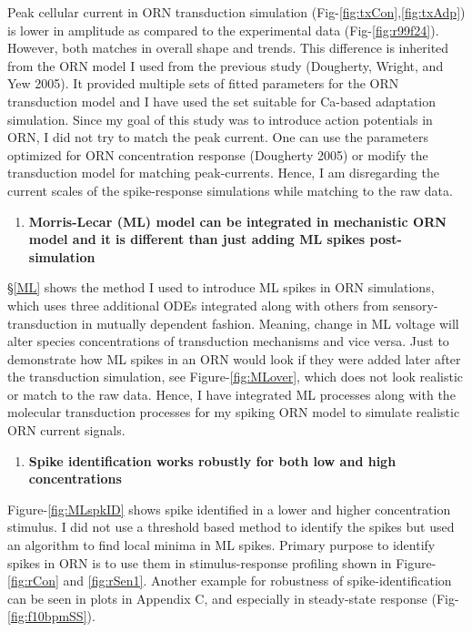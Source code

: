 \documentclass[
]{article}
\providecommand{\tightlist}{%
  \setlength{\itemsep}{0pt}\setlength{\parskip}{0pt}}
\begin{document}
Peak cellular current in ORN transduction simulation (Fig-\ref{fig:txCon},\ref{fig:txAdp}) is lower in amplitude as compared to the experimental data (Fig-\ref{fig:r99f24}). However, both matches in overall shape and trends. This difference is inherited from the ORN model I used from the previous study (Dougherty, Wright, and Yew 2005). It provided multiple sets of fitted parameters for the ORN transduction model and I have used the set suitable for Ca-based adaptation simulation. Since my goal of this study was to introduce action potentials in ORN, I did not try to match the peak current. One can use the parameters optimized for ORN concentration response (Dougherty 2005) or modify the transduction model for matching peak-currents. Hence, I am disregarding the current scales of the spike-response simulations while matching to the raw data.

\begin{enumerate}
\def\labelenumi{\Alph{enumi}.}
\setcounter{enumi}{1}
\tightlist
\item
  \textbf{Morris-Lecar (ML) model can be integrated in mechanistic ORN model and it is different than just adding ML spikes post-simulation}
\end{enumerate}

\S\ref{ML} shows the method I used to introduce ML spikes in ORN simulations, which uses three additional ODEs integrated along with others from sensory-transduction in mutually dependent fashion. Meaning, change in ML voltage will alter species concentrations of transduction mechanisms and vice versa. Just to demonstrate how ML spikes in an ORN would look if they were added later after the transduction simulation, see Figure-\ref{fig:MLover}, which does not look realistic or match to the raw data. Hence, I have integrated ML processes along with the molecular transduction processes for my spiking ORN model to simulate realistic ORN current signals.

\begin{enumerate}
\def\labelenumi{\Alph{enumi}.}
\setcounter{enumi}{2}
\tightlist
\item
  \textbf{Spike identification works robustly for both low and high concentrations}
\end{enumerate}

Figure-\ref{fig:MLspkID} shows spike identified in a lower and higher concentration stimulus. I did not use a threshold based method to identify the spikes but used an algorithm to find local minima in ML spikes. Primary purpose to identify spikes in ORN is to use them in stimulus-response profiling shown in Figure-\ref{fig:rCon} and \ref{fig:rSen1}. Another example for robustness of spike-identification can be seen in plots in Appendix C, and especially in steady-state response (Fig-\ref{fig:f10bpmSS}).
\end{document}
